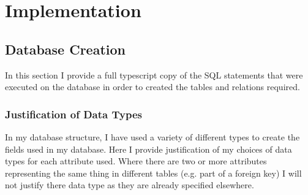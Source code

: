 \documentclass{article}
\begin{document}
\section{Implementation}
\subsection{Database Creation}
In this section I provide a full typescript copy of the SQL statements that were executed on the database in order to created the tables and relations required.



\subsubsection{Justification of Data Types}
In my database structure, I have used a variety of different types to create the fields used in my database. Here I provide justification of my choices of data types for each attribute used. Where there are two or more attributes representing the same thing in different tables (e.g. part of a foreign key) I will not justify there data type as they are already specified elsewhere.
\end{document}

